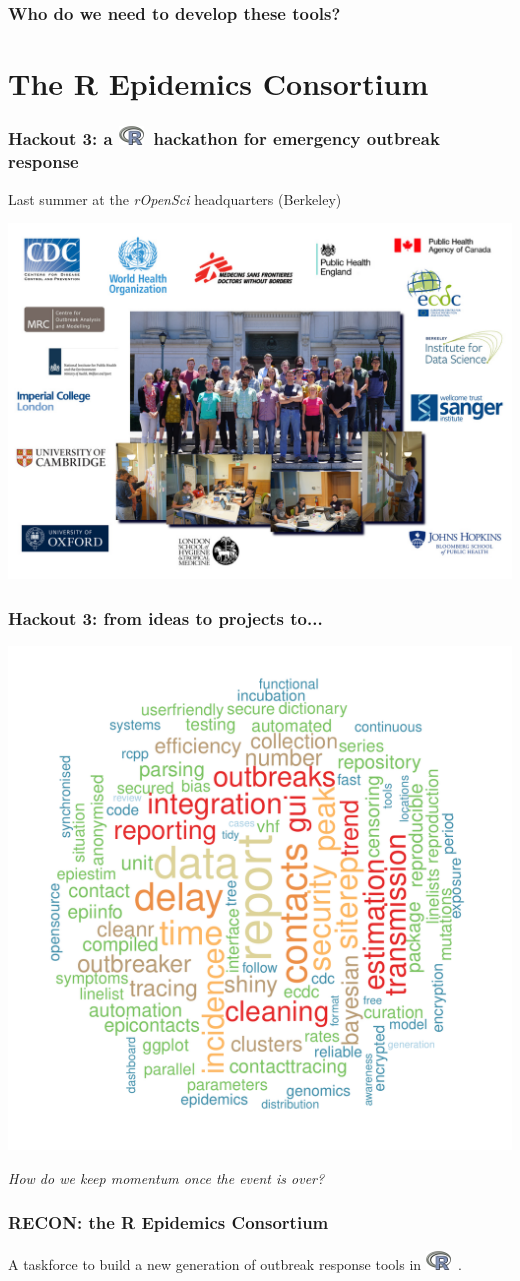 \documentclass[xcolor=svgnames,mathserif]{beamer}
\newcommand{\Rlogo}{\includegraphics[width=0.05\textwidth]{figs/Rlogo-transp}~}
\begin{document}
\begin{frame}[fragile]
  \frametitle{Who do we need to develop these tools?}

\vspace{-.5cm}
\begin{center} 


\end{center}


\end{frame}






\section{The R Epidemics Consortium}


\begin{frame}[fragile]
  \frametitle{Hackout 3: a \Rlogo hackathon for emergency outbreak response}

  Last summer at the \textit{rOpenSci} headquarters (Berkeley)
\vspace{-.3cm}
\begin{center} 
\includegraphics[width=.75 \textwidth]{figs/hackout3}
\end{center}


\end{frame}






\begin{frame}[fragile]
  \frametitle{Hackout 3: from ideas to projects to...}

\vspace{-.3cm}
\begin{center} 
\includegraphics[width=.65 \textwidth]{figs/wordcloud.pdf}

\pause
\emph{How do we keep momentum once the event is over?}
\end{center}


\end{frame}






\begin{frame}[fragile]
  \frametitle{RECON: the \textbf{R} \textbf{E}pidemics \textbf{Con}sortium}
  
\small A taskforce to build a new generation of outbreak response tools in \Rlogo.


\end{frame}
\end{document}
